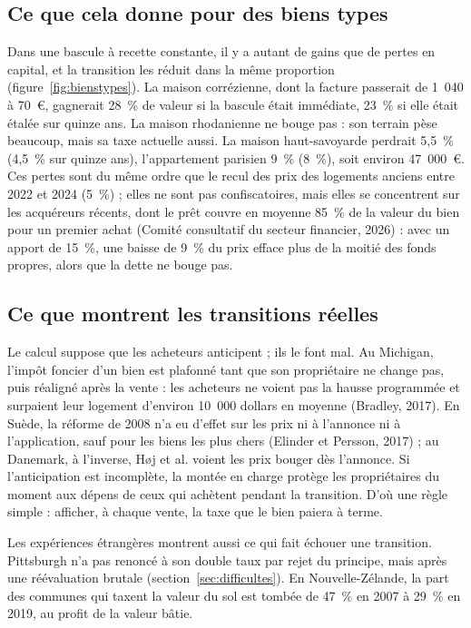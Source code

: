 \documentclass[11pt,a4paper]{article}
\begin{document}
\subsection{Ce que cela donne pour des biens types}

Dans une bascule à recette constante, il y a autant de gains que de pertes en capital, et la
transition les réduit dans la même proportion (figure~\ref{fig:bienstypes}). La maison corrézienne,
dont la facture passerait de 1~040 à 70~€, gagnerait 28~\% de valeur si la bascule était immédiate,
23~\% si elle était étalée sur quinze ans. La maison rhodanienne ne bouge pas : son terrain pèse
beaucoup, mais sa taxe actuelle aussi. La maison haut-savoyarde perdrait 5,5~\% (4,5~\% sur quinze
ans), l'appartement parisien 9~\% (8~\%), soit environ 47~000~€. Ces pertes sont du même ordre que le
recul des prix des logements anciens entre 2022 et 2024 (5~\%) ; elles ne sont pas confiscatoires, mais elles se concentrent sur les
acquéreurs récents, dont le prêt couvre en moyenne 85~\% de la valeur du bien pour un premier achat (Comité
consultatif du secteur financier, 2026) : avec un apport de 15~\%, une baisse de 9~\% du prix efface
plus de la moitié des fonds propres, alors que la dette ne bouge pas.


\subsection{Ce que montrent les transitions réelles}

Le calcul suppose que les acheteurs anticipent ; ils le font mal. Au
Michigan, l'impôt foncier d'un bien est plafonné tant que son propriétaire ne change pas, puis
réaligné après la vente : les acheteurs ne voient pas la hausse programmée et surpaient leur
logement d'environ 10~000 dollars en moyenne (Bradley, 2017). En Suède, la réforme de 2008 n'a
eu d'effet sur les prix ni à l'annonce ni à l'application, sauf pour les biens les plus chers
(Elinder et Persson, 2017) ; au Danemark, à l'inverse, Høj et al. voient les prix bouger dès
l'annonce. Si l'anticipation est incomplète, la montée en charge protège les propriétaires du
moment aux dépens de ceux qui achètent pendant la transition. D'où une règle simple : afficher, à
chaque vente, la taxe que le bien paiera à terme.

Les expériences étrangères montrent aussi ce qui fait échouer une transition. Pittsburgh n'a pas
renoncé à son double taux par rejet du principe, mais après une réévaluation brutale
(section~\ref{sec:difficultes}). En Nouvelle-Zélande, la part des communes qui
taxent la valeur du sol est tombée de 47~\% en 2007 à 29~\% en 2019, au profit de la valeur
bâtie.
\end{document}

